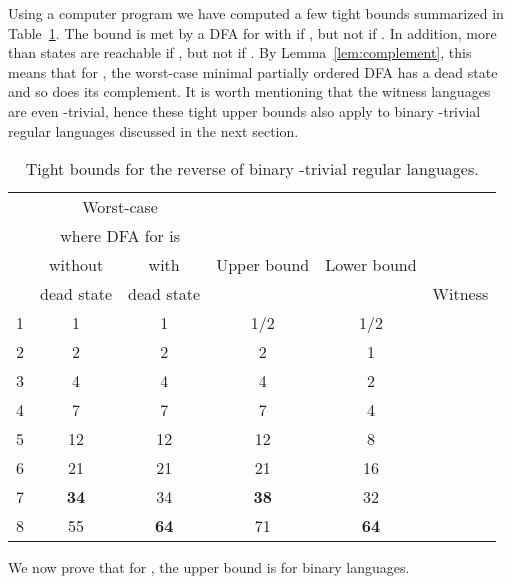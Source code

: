 \documentclass[runningheads]{llncs}
\newcommand{\R}{}
\newcommand{\J}{}
\begin{document}
  Using a computer program 
  we have computed a few tight bounds 
  summarized in Table~\ref{tab}.
  The bound  is met by a DFA for  with  if ,
  but not if . 
  In addition, more than  states are reachable if ,
  but not if .
  By Lemma~\ref{lem:complement}, this means that for , the worst-case minimal partially ordered DFA has a dead state and so does its complement.
  It is worth mentioning that the witness languages are even \J-trivial, hence these tight upper bounds also apply to binary \J-trivial regular languages discussed in the next section.
  \begin{table}[h]
    \centering
      \begin{tabular}{c|c|c||c|c|l}
                     & \multicolumn{2}{c||}{Worst-case } &  &  & \\
                     & \multicolumn{2}{c||}{where DFA for  is}  &  &  & \\
                 & without    & with                           & Upper bound   & Lower bound & \\
             & dead state & dead state                     &  &    & \multicolumn{1}{c}{Witness}\\
        \hline
        1 & 1        & 1        & 1/2       & 1/2     & \\
        2 & 2        & 2        & 2         & 1       &  \\
        3 & 4        & 4        & 4         & 2       &  \\
        4 & 7        & 7        & 7         & 4       &  \\
        5 & 12       & 12       & 12        & 8       &  \\
        6 & 21       & 21       & 21        & 16      &  \\
        7 & {\bf 34} & 34       & {\bf 38}  & 32      &  \\
        8 & 55       & {\bf 64} & 71        & {\bf 64}&
      \end{tabular}
      \smallskip
      \caption{Tight bounds for the reverse of binary \R-trivial regular languages.}
      \label{tab}
  \end{table}
  
  We now prove that for , the upper bound is  for binary languages. 
\end{document}
